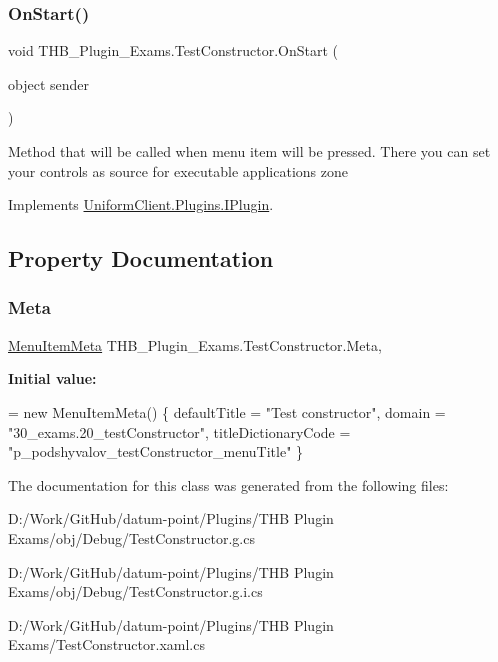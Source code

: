 \subsubsection{\texorpdfstring{On\+Start()}{OnStart()}}
{\footnotesize\ttfamily void T\+H\+B\+\_\+\+Plugin\+\_\+\+Exams.\+Test\+Constructor.\+On\+Start (\begin{DoxyParamCaption}\item[{object}]{sender }\end{DoxyParamCaption})}



Method that will be called when menu item will be pressed. There you can set your controls as source for executable application\textquotesingle{}s zone 



Implements \mbox{\hyperlink{interface_uniform_client_1_1_plugins_1_1_i_plugin_a1ca2220c7ce4a23f8f41af10efccf328}{Uniform\+Client.\+Plugins.\+I\+Plugin}}.



\subsection{Property Documentation}
\mbox{\label{class_t_h_b___plugin___exams_1_1_test_constructor_a85cefaa72576228ed78d6c8702efcc1d}} 
\subsubsection{\texorpdfstring{Meta}{Meta}}
{\footnotesize\ttfamily \mbox{\hyperlink{class_uniform_client_1_1_plugins_1_1_menu_item_meta}{Menu\+Item\+Meta}} T\+H\+B\+\_\+\+Plugin\+\_\+\+Exams.\+Test\+Constructor.\+Meta\hspace{0.3cm}{\ttfamily [get]}, {\ttfamily [set]}}

{\bfseries Initial value\+:}
\begin{DoxyCode}
= \textcolor{keyword}{new} MenuItemMeta() \{
            defaultTitle = \textcolor{stringliteral}{"Test constructor"},
            domain = \textcolor{stringliteral}{"30\_exams.20\_testConstructor"},
            titleDictionaryCode = \textcolor{stringliteral}{"p\_podshyvalov\_testConstructor\_menuTitle"} \}
\end{DoxyCode}


The documentation for this class was generated from the following files\+:\begin{DoxyCompactItemize}
\item 
D\+:/\+Work/\+Git\+Hub/datum-\/point/\+Plugins/\+T\+H\+B Plugin Exams/obj/\+Debug/Test\+Constructor.\+g.\+cs\item 
D\+:/\+Work/\+Git\+Hub/datum-\/point/\+Plugins/\+T\+H\+B Plugin Exams/obj/\+Debug/Test\+Constructor.\+g.\+i.\+cs\item 
D\+:/\+Work/\+Git\+Hub/datum-\/point/\+Plugins/\+T\+H\+B Plugin Exams/Test\+Constructor.\+xaml.\+cs\end{DoxyCompactItemize}
